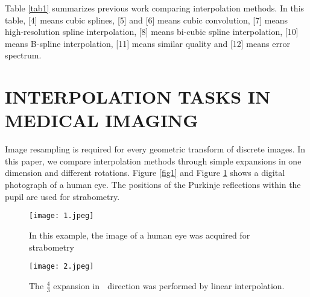 \documentclass[a4paper]{article}
\begin{document}
Table \ref{tab1} summarizes previous work comparing interpolation methods. In this table, [4] means cubic splines, [5] and [6] means cubic convolution, [7] means high-resolution spline interpolation, [8] means bi-cubic spline interpolation, [10] means B-spline interpolation, [11] means similar quality and [12] means error spectrum. \\
\section{INTERPOLATION TASKS IN MEDICAL IMAGING}
Image resampling is required for every geometric transform of discrete images. In this paper, we compare interpolation methods through simple expansions in one dimension and different rotations. Figure \ref{fig1} and Figure \ref{fig2} shows a digital photograph of a human eye. The positions of the Purkinje reflections within the pupil are used for strabometry.\\
\begin{figure}[htbp]
\centering
\begin{minipage}[t]{0.48\textwidth}
\centering
\texttt{[image: 1.jpeg]}
\caption{In this example, the image of a human eye was acquired for strabometry}
\label{fig1}
\end{minipage}
\begin{minipage}[t]{0.48\textwidth}
\centering
\texttt{[image: 2.jpeg]}
\caption{The $\frac{4}{3}$ expansion in 􏰏 direction was performed by linear interpolation.
}
\label{fig2}
\end{minipage}
\end{figure}
\end{document}
